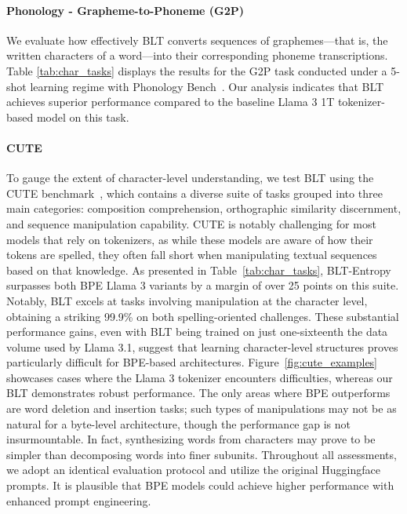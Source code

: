 \paragraph{Phonology - Grapheme-to-Phoneme (G2P)} We evaluate how effectively {\textsc BLT} converts sequences of graphemes—that is, the written characters of a word—into their corresponding phoneme transcriptions. Table \ref{tab:char_tasks} displays the results for the G2P task conducted under a 5-shot learning regime with Phonology Bench~\citep{suvarna2024phonologybench}. Our analysis indicates that {\textsc BLT} achieves superior performance compared to the baseline Llama 3 1T tokenizer-based model on this task.

\paragraph{CUTE}
To gauge the extent of character-level understanding, we test {\textsc BLT} using the CUTE benchmark~\citep{edman2024cute}, which contains a diverse suite of tasks grouped into three main categories: composition comprehension, orthographic similarity discernment, and sequence manipulation capability. CUTE is notably challenging for most models that rely on tokenizers, as while these models are aware of how their tokens are spelled, they often fall short when manipulating textual sequences based on that knowledge. As presented in Table~\ref{tab:char_tasks}, {\textsc BLT}-Entropy surpasses both BPE Llama 3 variants by a margin of over 25 points on this suite. Notably, {\textsc BLT} excels at tasks involving manipulation at the character level, obtaining a striking 99.9\% on both spelling-oriented challenges. These substantial performance gains, even with {\textsc BLT} being trained on just one-sixteenth the data volume used by Llama 3.1, suggest that learning character-level structures proves particularly difficult for BPE-based architectures. Figure~\ref{fig:cute_examples} showcases cases where the Llama 3 tokenizer encounters difficulties, whereas our {\textsc BLT} demonstrates robust performance. The only areas where BPE outperforms are word deletion and insertion tasks; such types of manipulations may not be as natural for a byte-level architecture, though the performance gap is not insurmountable. In fact, synthesizing words from characters may prove to be simpler than decomposing words into finer subunits. Throughout all assessments, we adopt an identical evaluation protocol and utilize the original Huggingface prompts. It is plausible that BPE models could achieve higher performance with enhanced prompt engineering.

